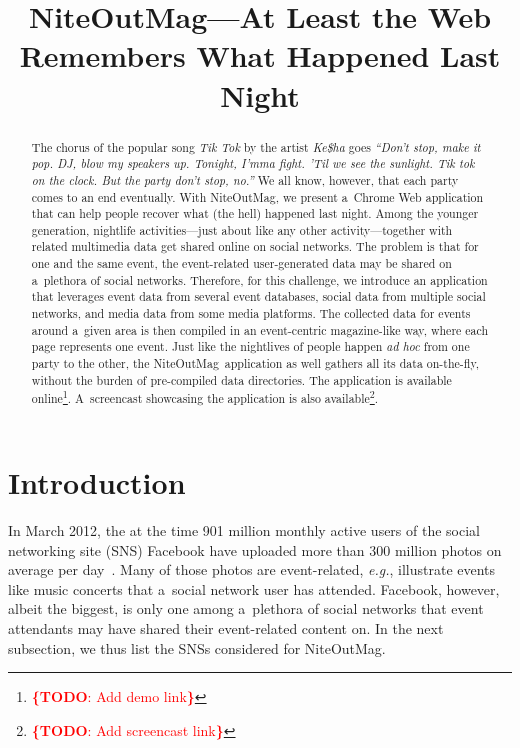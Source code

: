 \documentclass{acm_proc_article-sp}
\let\oldemph\emph
\renewcommand{\emph}[1]{\oldemph{\fontsize{9}{9}\selectfont #1}}
\newcommand{\todo}[1]{\noindent\textcolor{red}{{\bf \{TODO}: #1{\bf \}}}}
\begin{document}
\title{NiteOutMag\hspace{-1.5pt}---At Least the Web\\ Remembers What Happened Last Night}

\author{
}
\maketitle

\begin{abstract}
The chorus of the popular song \emph{Tik Tok} by the artist \emph{Ke\$ha} goes
\emph{``Don't stop, make it pop. DJ, blow my speakers up. Tonight, I'mma fight.
'Til we see the sunlight. Tik tok on the clock. But the party don't stop, no.''}
We all know, however, that each party comes to an end eventually.
With NiteOutMag\texttrademark, we present a~Chrome Web application
that can help people recover what (the hell) happened last night.
Among the younger generation, nightlife activities---just about like any other
activity---together with related multimedia data get shared online on social networks.
The problem is that for one and the same event, the event-related user-generated data
may be shared on a~plethora of social networks.
Therefore, for this challenge, we introduce an application
that leverages event data from several event databases,
social data from multiple social networks, and media data from some media platforms.
The collected data for events around a~given area is then compiled
in an event-centric magazine-like way, where each page represents one event.
Just like the nightlives of people happen \emph{ad hoc} from one party to the other,
the NiteOutMag\texttrademark~application as well
gathers all its data on-the-fly, without the burden of pre-compiled data directories.
The application is available online\footnote{\todo{Add demo link}}.
A~screencast showcasing the application is also available\footnote{\todo{Add screencast link}}.
\end{abstract}



\section{Introduction}
In March 2012, the at the time 901 million monthly active users
of the social networking site (SNS) Facebook
have uploaded more than 300 million photos on average per day~\cite{Facebook2012}.
Many of those photos are event-related, \emph{e.g.},
illustrate events like music concerts that a~social network user has attended.
Facebook, however, albeit the biggest, is only one among a~plethora of social networks
that event attendants may have shared their event-related content on.
In the next subsection, we thus list the SNSs considered for
NiteOutMag\texttrademark.
\end{document}

